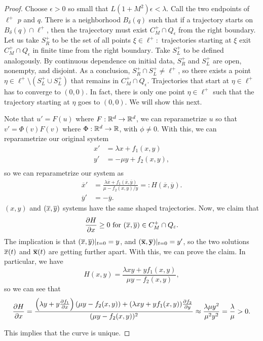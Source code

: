 \documentclass{article}
\begin{document}
\begin{proof}
        Choose $\epsilon > 0$ so small that $L(1 + M^2) \epsilon < \lambda$. Call the two endpoints of $\ell^+$ $p$ and $q$. There is a neighborhood $B_\delta(q)$ such that if a trajectory starts on $B_\delta(q) \cap \ell^+$, then the trajecctory must exist $C_M^+ \cap Q_\epsilon$ from the right boundary. Let us take $S_R^+$ to be the set of all points $\xi \in \ell^+ : $ trajectories starting at $\xi$ exit $C_M^+ \cap Q_\epsilon$ in finite time from the right boundary$.$ Take $S^+_L$ to be defined analogously. By continuous dependence on initial data, $S_R^+$ and $S_L^+$ are open, nonempty, and disjoint. As a conclusion, $S_R^+ \cap S_L^+ \neq \ell^+$, so there exists a point $\eta \in \ell^+ \setminus (S_L^+ \cup S_L^+)$ that remains in $C_M^+ \cap Q_\epsilon$. Trajectories that start at $\eta \in \ell^+$ has to converge to $(0, 0)$. In fact, there is only one point $\eta \in \ell^+$ such that the trajectory starting at $\eta$ goes to $(0, 0)$. We will show this next. 
        \newpar 

        Note that $u' = F(u)$ where $F: \mathbb{R}^d \to \mathbb{R}^d$, we can reparametrize $u$ so that $v' = \Phi(v) F(v)$ where $\Phi: \mathbb{R}^d \to \mathbb{R}$, with $\phi \neq 0$. With this, we can reparametrize our original system 
        \begin{align*}
            x' &= \lambda x + f_1(x, y) \\
            y' &= -\mu y + f_2(x, y), \\
        \end{align*}
        so we can reparametrize our system as 
        \begin{align*}  
            \overline{x}' &= \frac{\lambda \overline x + f_1(\overline x, \overline y)}{\mu - f_2(x, y) / y} =: H(\overline x, \overline y).\\
            \overline y ' &= -\overline y. 
        \end{align*}
        $(x, y)$ and $(\overline x, \overline y)$ systems have the same shaped trajectories. Now, we claim that 
        \[
            \pdv{H}{x}(\overline x, \overline y) \geq 0 \text{ for } (\overline x, \overline y) \in C_M^+ \cap Q_\varepsilon. 
        \]
        The implication is that $(\overline x, \overline y) |_{t = 0} = y$, and $(\overline{\mathbf x}, \overline{\mathbf y}) |_{t = 0} = y'$, so the two solutions $\overline x(t)$ and $\overline{\mathbf x}(t)$ are getting further apart. With this, we can prove the claim. In particular, we have 
        \[
            H(x, y) = \frac{\lambda x y + y f_1(x, y)}{\mu y - f_2(x, y)},
        \]
        so we can see that 
        \[
            \pdv{H}{x} = \frac{\left(\lambda y + y \pdv{f_1}{x}(x, y)\right)(\mu y - f_2(x, y)) + (\lambda xy + yf_1(x, y)) \pdv{f_2}{y}(x, y)}{(\mu y - f_2 (x, y))^2}  \approx \frac{\lambda \mu y^2}{\mu^2 y^2} = \frac{\lambda}{\mu} > 0. 
        \]

        This implies that the curve is unique. 
    \end{proof}
\end{document}
